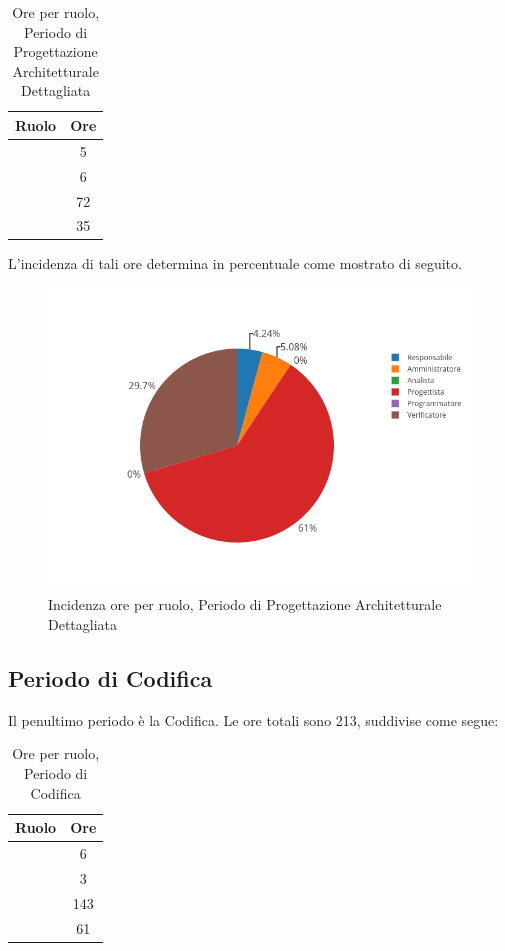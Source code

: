\begin{table}[H]
	\begin{center}
		\begin{tabular}{|c|c|}
			\hline
			\textbf{Ruolo}	& \textbf{Ore} \\
			\hline
			\Res	&	5	\\
			\hline
			\Amm	&	6	\\
			\hline
			\Prog   &	72	\\
			\hline
			\Ver	&	35	\\
			\hline
		\end{tabular}
	\end{center}
	\caption{Ore per ruolo, Periodo di Progettazione Architetturale Dettagliata}
\end{table}

L'incidenza di tali ore determina in percentuale come mostrato di seguito.
\begin{figure}[H]
	\centering
	\includegraphics[scale=0.6]{img/ProgettazioneDettaglio.png}
	\caption{Incidenza ore per ruolo, Periodo di Progettazione Architetturale Dettagliata}
\end{figure}

\subsection{Periodo di Codifica}
Il penultimo periodo è la Codifica. Le ore totali sono 213, suddivise come segue:

\begin{table}[H]
	\begin{center}
		\begin{tabular}{|c|c|}
			\hline
			\textbf{Ruolo}	& \textbf{Ore} \\
			\hline
			\Res	&	6	\\
			\hline
			\Amm	&	3	\\
			\hline
			\Progr   &	143	\\
			\hline
			\Ver	&	61	\\
			\hline
		\end{tabular}
	\end{center}
	\caption{Ore per ruolo, Periodo di Codifica}
\end{table}

